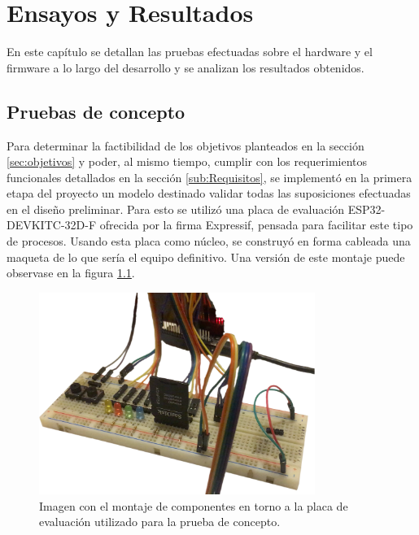 
\chapter{Ensayos y Resultados} %
\label{Chapter4}

En este capítulo se detallan las pruebas efectuadas sobre el hardware y el firmware a lo largo del desarrollo y se analizan los resultados obtenidos.
 
\section{Pruebas de concepto}
\label{sec:PruebasConcepto}

Para determinar la factibilidad de los objetivos planteados en la sección \ref{sec:objetivos} y poder, al mismo tiempo, cumplir con los requerimientos funcionales detallados en la sección \ref{sub:Requisitos}, se implementó en la primera etapa del proyecto un modelo destinado validar todas las suposiciones efectuadas en el diseño preliminar. Para esto se utilizó una placa de evaluación ESP32-DEVKITC-32D-F ofrecida por la firma Expressif, pensada para facilitar este tipo de procesos. Usando esta placa como núcleo, se construyó en forma cableada una maqueta de lo que sería el equipo definitivo. Una versión de este montaje puede observase en la figura \ref{fig:Demostrador}.

\begin{figure}[ht]
	\centering
	\includegraphics[width=0.8\textwidth]{Figures/Demostrador.png}
	\caption[Montaje utilizado para las pruebas de concepto]{Imagen con el montaje de componentes en torno a la placa de evaluación utilizado para la prueba de concepto.}
	\label{fig:Demostrador}
\end{figure}

